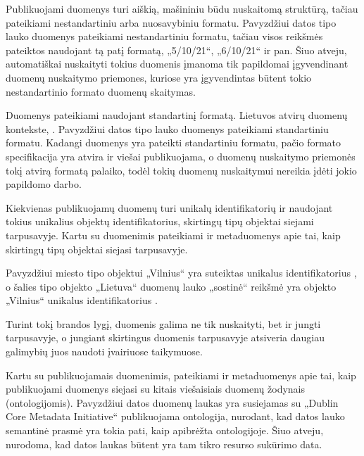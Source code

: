 \documentclass[letterpaper,10pt,lithuanian]{sphinxmanual}
\begin{document}
\begin{description}
\begin{description}
\sphinxAtStartPar
Publikuojami duomenys turi aiškią, mašininiu būdu nuskaitomą
struktūrą, tačiau pateikiami nestandartiniu arba nuosavybiniu
formatu. Pavyzdžiui datos tipo lauko duomenys pateikiami
nestandartiniu formatu, tačiau visos reikšmės pateiktos naudojant tą
patį formatą, „5/10/21“, „6/10/21“ ir pan. Šiuo atveju, automatiškai
nuskaityti tokius duomenis įmanoma tik papildomai įgyvendinant
duomenų nuskaitymo priemones, kuriose yra įgyvendintas būtent tokio
nestandartinio formato duomenų skaitymas.

\sphinxAtStartPar
Duomenys pateikiami naudojant standartinį formatą. Lietuvos atvirų
duomenų kontekste, {\hyperref[\detokenize{tipai:duomenu-tipai}]{}}.
Pavyzdžiui datos tipo lauko duomenys pateikiami standartiniu  formatu. Kadangi duomenys yra pateikti standartiniu formatu,
pačio formato specifikacija yra atvira ir viešai publikuojama, o
duomenų nuskaitymo priemonės tokį atvirą formatą palaiko, todėl
tokių duomenų nuskaitymui nereikia įdėti jokio papildomo darbo.

\sphinxAtStartPar
Kiekvienas publikuojamų duomenų {\hyperref[\detokenize{savokos:term-objektas}]{}} turi unikalų
identifikatorių ir naudojant tokius unikalius objektų
identifikatorius, skirtingų tipų objektai siejami tarpusavyje.
Kartu su duomenimis pateikiami ir metaduomenys apie tai, kaip
skirtingų tipų objektai siejasi tarpusavyje.

\sphinxAtStartPar
Pavyzdžiui miesto tipo objektui „Vilnius“ yra suteiktas unikalus
identifikatorius , o šalies
tipo objekto „Lietuva“ duomenų lauko „sostinė“ reikšmė yra objekto
„Vilnius“ unikalus identifikatorius
.

\sphinxAtStartPar
Turint tokį brandos lygį, duomenis galima ne tik nuskaityti, bet ir
jungti tarpusavyje, o jungiant skirtingus duomenis tarpusavyje
atsiveria daugiau galimybių juos naudoti įvairiuose taikymuose.

\sphinxAtStartPar
Kartu su publikuojamais duomenimis, pateikiami ir metaduomenys
apie tai, kaip publikuojami duomenys siejasi su kitais viešaisiais
duomenų žodynais (ontologijomis). Pavyzdžiui datos duomenų laukas
yra susiejamas su „Dublin Core Metadata Initiative“ publikuojama
ontologija, nurodant, kad datos lauko semantinė prasmė yra tokia
pati, kaip apibrėžta  ontologijoje. Šiuo atveju,
nurodoma, kad datos laukas būtent yra tam tikro resurso sukūrimo
data.


\end{description}
\end{description}
\end{document}
